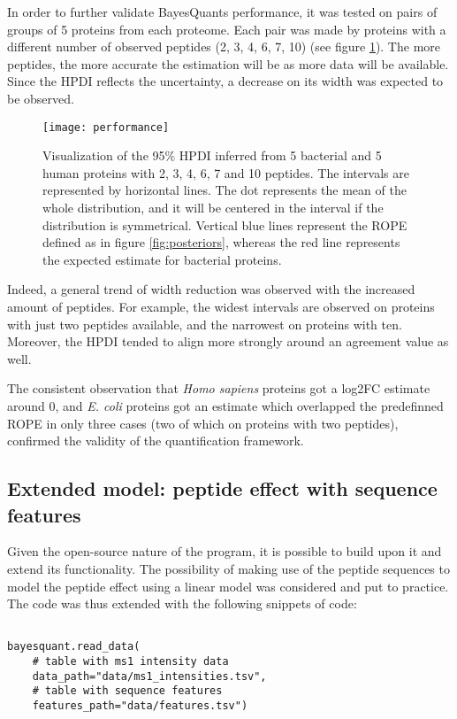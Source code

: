 In order to further validate BayesQuant\textquotesingle s performance, it was tested on pairs of groups of 5 proteins from each proteome. Each pair was made by proteins with a different number of observed peptides (2, 3, 4, 6, 7, 10) (see figure \ref{fig:dumbbell}). The more peptides, the more accurate the estimation will be as more data will be available. Since the \ac{HPDI} reflects the uncertainty, a decrease on its width was expected to be observed.

\begin{figure}[!h]
\centering
\texttt{[image: performance]}
\caption[HPDI inferred by BayesQuant]{Visualization of the 95\% \ac{HPDI} inferred from 5 bacterial and 5 human proteins with 2, 3, 4, 6, 7 and 10 peptides. The intervals are represented by horizontal lines. The dot represents the mean of the whole distribution, and it will be centered in the interval if the distribution is symmetrical. Vertical blue lines represent the ROPE defined as in figure \ref{fig:posteriors}, whereas the red line represents the expected estimate for bacterial proteins.}
\label{fig:dumbbell}
\end{figure}


Indeed, a general trend of width reduction was observed with the increased amount of peptides. For example, the widest intervals are observed on proteins with just two peptides available, and the narrowest on proteins with ten. Moreover, the \ac{HPDI} tended to align more strongly around an agreement value as well. 

The consistent observation that \textit{Homo sapiens} proteins got a \ac{log2FC} estimate around 0, and \textit{E. coli} proteins got an estimate which overlapped the predefinned \ac{ROPE} in only three cases (two of which on proteins with two peptides), confirmed the validity of the quantification framework.

\subsection{Extended model: peptide effect with sequence features}
\label{subsec:extended_model}

Given the open-source nature of the program, it is possible to build upon it and extend its functionality. The possibility of making use of the peptide sequences to model the peptide effect using a linear model was considered and put to practice. The code was thus extended with the following snippets of code:

\begin{verbatim}

bayesquant.read_data(
    # table with ms1 intensity data
    data_path="data/ms1_intensities.tsv",
    # table with sequence features
    features_path="data/features.tsv")
\end{verbatim}


